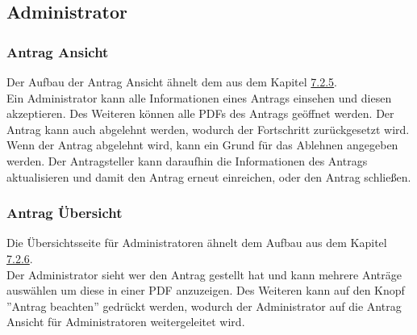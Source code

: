 \subsection{Administrator}
\subsubsection{Antrag Ansicht}
Der Aufbau der Antrag Ansicht ähnelt dem aus dem Kapitel \hyperref[sec:antrag_ansicht]{7.2.5}.\\
Ein Administrator kann alle Informationen eines Antrags einsehen und diesen akzeptieren. Des Weiteren können alle PDFs des Antrags geöffnet werden. Der Antrag kann auch abgelehnt werden, wodurch der Fortschritt zurückgesetzt wird. Wenn der Antrag abgelehnt wird, kann ein Grund für das Ablehnen angegeben werden. Der Antragsteller kann daraufhin die Informationen des Antrags aktualisieren und damit den Antrag erneut einreichen, oder den Antrag schließen.
\subsubsection{Antrag Übersicht}
Die Übersichtsseite für Administratoren ähnelt dem Aufbau aus dem Kapitel \hyperref[sec:antrag_uebersicht]{7.2.6}.\\
Der Administrator sieht wer den Antrag gestellt hat und kann mehrere Anträge auswählen um diese in einer PDF anzuzeigen.
Des Weiteren kann auf den Knopf ''Antrag beachten'' gedrückt werden, wodurch der Administrator auf die Antrag Ansicht für Administratoren weitergeleitet wird.